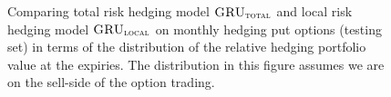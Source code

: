 \documentclass[letterpaper,12pt,titlepage,oneside,final]{book}
\numberwithin{equation}{section}
\theoremstyle{definition}
\newcommand{\modelT}{\textsc{GRU}_{\textsc{total}}}
\newcommand{\modelL}{\textsc{GRU}_{\textsc{local}}}
\begin{document}
\begin{figure}[htp!]
	\centering
	\caption{Comparing total risk hedging model $\modelT$ and local risk hedging model $\modelL$ on monthly hedging put options (testing set) in terms of the distribution of the  relative hedging portfolio value at the expiries. The distribution in this figure assumes we are on the sell-side of the option trading.} \label{fig:putTotalM1}
	\centering

\end{figure}
\end{document}
